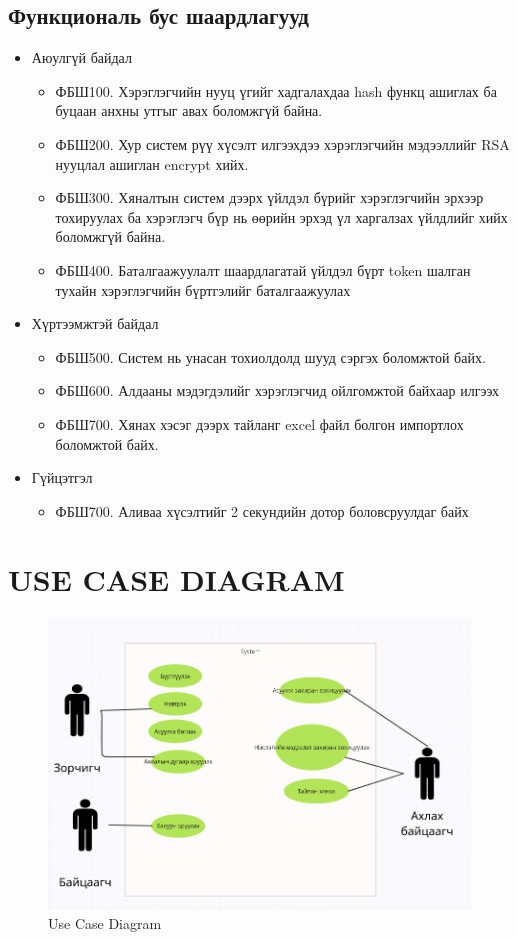 \subsection{Функциональ бус шаардлагууд}
\begin{itemize}
    \item Аюулгүй байдал 
    \begin{itemize}
        \item ФБШ100. Хэрэглэгчийн нууц үгийг хадгалахдаа hash функц ашиглах ба буцаан анхны утгыг авах боломжгүй байна. 
        \item ФБШ200. Хур систем рүү хүсэлт илгээхдээ хэрэглэгчийн мэдээллийг RSA нууцлал ашиглан encrypt хийх. 
        \item ФБШ300. Хяналтын систем дээрх үйлдэл бүрийг хэрэглэгчийн эрхээр тохируулах ба хэрэглэгч бүр нь өөрийн эрхэд үл харгалзах үйлдлийг хийх боломжгүй байна. 
        \item ФБШ400. Баталгаажуулалт шаардлагатай үйлдэл бүрт token шалган тухайн хэрэглэгчийн бүртгэлийг баталгаажуулах 
    \end{itemize}

    \item Хүртээмжтэй байдал 
    \begin{itemize}
        \item ФБШ500. Систем нь унасан тохиолдолд шууд сэргэх боломжтой байх. 
        \item ФБШ600. Алдааны мэдэгдэлийг хэрэглэгчид ойлгомжтой байхаар илгээх 
        \item ФБШ700. Хянах хэсэг дээрх тайланг excel файл болгон импортлох боломжтой байх. 
    \end{itemize}

    \item Гүйцэтгэл 
    \begin{itemize}
        \item ФБШ700. Аливаа хүсэлтийг 2 секундийн дотор боловсруулдаг байх
    \end{itemize}
\end{itemize}

\section{USE CASE DIAGRAM}
\begin{figure}[H]
    \centering
    \includegraphics[scale=0.5]{usecase.png}
    \caption{Use Case Diagram}
    \label{fig:my_label}
\end{figure}
